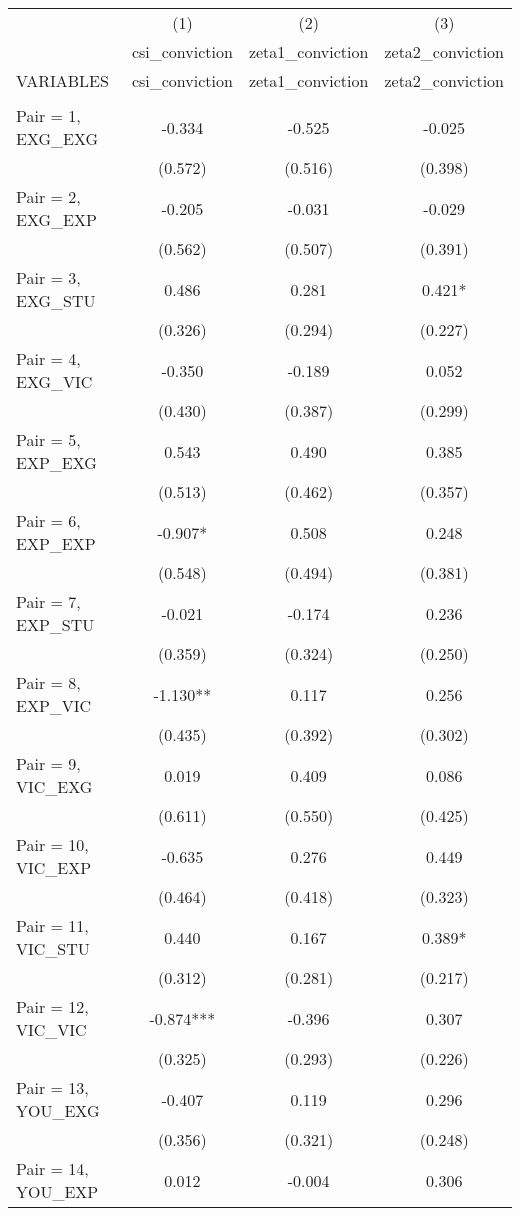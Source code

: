 \documentclass[]{article}
\begin{document}
\begin{tabular}{lccc} \hline
 & (1) & (2) & (3) \\
 & csi\_conviction & zeta1\_conviction & zeta2\_conviction \\
VARIABLES & csi\_conviction & zeta1\_conviction & zeta2\_conviction \\ \hline
 &  &  &  \\
Pair = 1, EXG\_EXG & -0.334 & -0.525 & -0.025 \\
 & (0.572) & (0.516) & (0.398) \\
Pair = 2, EXG\_EXP & -0.205 & -0.031 & -0.029 \\
 & (0.562) & (0.507) & (0.391) \\
Pair = 3, EXG\_STU & 0.486 & 0.281 & 0.421* \\
 & (0.326) & (0.294) & (0.227) \\
Pair = 4, EXG\_VIC & -0.350 & -0.189 & 0.052 \\
 & (0.430) & (0.387) & (0.299) \\
Pair = 5, EXP\_EXG & 0.543 & 0.490 & 0.385 \\
 & (0.513) & (0.462) & (0.357) \\
Pair = 6, EXP\_EXP & -0.907* & 0.508 & 0.248 \\
 & (0.548) & (0.494) & (0.381) \\
Pair = 7, EXP\_STU & -0.021 & -0.174 & 0.236 \\
 & (0.359) & (0.324) & (0.250) \\
Pair = 8, EXP\_VIC & -1.130** & 0.117 & 0.256 \\
 & (0.435) & (0.392) & (0.302) \\
Pair = 9, VIC\_EXG & 0.019 & 0.409 & 0.086 \\
 & (0.611) & (0.550) & (0.425) \\
Pair = 10, VIC\_EXP & -0.635 & 0.276 & 0.449 \\
 & (0.464) & (0.418) & (0.323) \\
Pair = 11, VIC\_STU & 0.440 & 0.167 & 0.389* \\
 & (0.312) & (0.281) & (0.217) \\
Pair = 12, VIC\_VIC & -0.874*** & -0.396 & 0.307 \\
 & (0.325) & (0.293) & (0.226) \\
Pair = 13, YOU\_EXG & -0.407 & 0.119 & 0.296 \\
 & (0.356) & (0.321) & (0.248) \\
Pair = 14, YOU\_EXP & 0.012 & -0.004 & 0.306 \\

\end{tabular}
\end{document}
